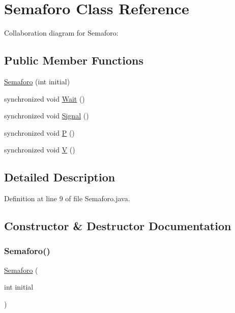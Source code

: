 \hypertarget{classcampane_1_1_semaforo}{}\section{Semaforo Class Reference}
\label{classcampane_1_1_semaforo}


Collaboration diagram for Semaforo\+:
\subsection*{Public Member Functions}
\begin{DoxyCompactItemize}
\item 
\hyperlink{classcampane_1_1_semaforo_a4a902d02b8d54863b69dcdf704a73139}{Semaforo} (int initial)
\item 
synchronized void \hyperlink{classcampane_1_1_semaforo_afc4e41716e5e0c87146c4d8b199f3c7a}{Wait} ()
\item 
synchronized void \hyperlink{classcampane_1_1_semaforo_a70e3e26de78b8ed879d1e5a790189bc8}{Signal} ()
\item 
synchronized void \hyperlink{classcampane_1_1_semaforo_a211c597de4dba43087fe4be696f7a8fa}{P} ()
\item 
synchronized void \hyperlink{classcampane_1_1_semaforo_a25fb40b302d2a2832f7845be9250e13b}{V} ()
\end{DoxyCompactItemize}


\subsection{Detailed Description}


Definition at line 9 of file Semaforo.\+java.



\subsection{Constructor \& Destructor Documentation}
\mbox{\label{classcampane_1_1_semaforo_a4a902d02b8d54863b69dcdf704a73139}} 
\subsubsection{\texorpdfstring{Semaforo()}{Semaforo()}}
{\footnotesize\ttfamily \hyperlink{classcampane_1_1_semaforo}{Semaforo} (\begin{DoxyParamCaption}\item[{int}]{initial }\end{DoxyParamCaption})}



